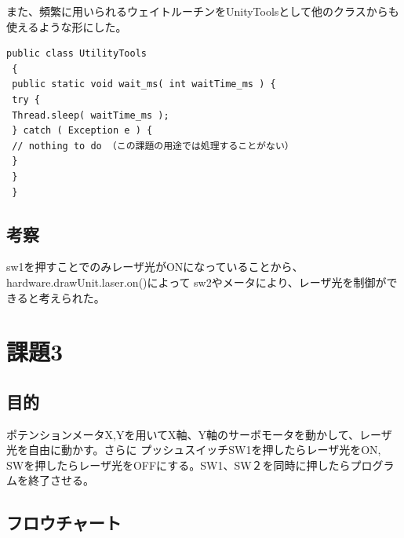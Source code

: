 \documentclass{jarticle}
\begin{document}
また、頻繁に用いられるウェイトルーチンをUnityToolsとして他のクラスからも使えるような形にした。
\begin{lstlisting}[caption=UtilityTools]
    public class UtilityTools
 {
 public static void wait_ms( int waitTime_ms ) {
 try {
 Thread.sleep( waitTime_ms );
 } catch ( Exception e ) {
 // nothing to do （この課題の用途では処理することがない）
 }
 }
 }
\end{lstlisting}

\subsection{考察}
sw1を押すことでのみレーザ光がONになっていることから、hardware.drawUnit.laser.on()によって
sw2やメータにより、レーザ光を制御ができると考えられた。


\section{課題3}
\subsection{目的}
ポテンションメータX,Yを用いてX軸、Y軸のサーボモータを動かして、レーザ光を自由に動かす。さらに
プッシュスイッチSW1を押したらレーザ光をON,
SWを押したらレーザ光をOFFにする。SW1、SW２を同時に押したらプログラムを終了させる。

\subsection{フロウチャート}
\end{document}

